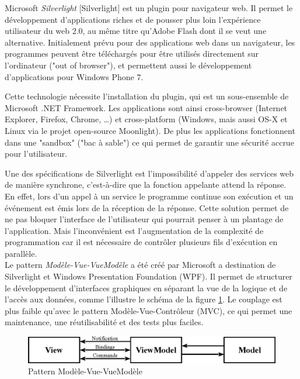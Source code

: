 
Microsoft \textit{Silverlight} [Silverlight] est un plugin pour navigateur web.
Il permet le développement d'applications riches et de pousser plus loin l'expérience utilisateur du web 2.0, au même titre qu'Adobe Flash dont il se veut une alternative.
Initialement prévu pour des applications web dans un navigateur, les programmes peuvent être téléchargés pour être utilisés directement sur l'ordinateur ("out of browser"), et permettent aussi le développement d'applications pour Windows Phone 7.

Cette technologie nécessite l'installation du plugin, qui est un sous-ensemble de Microsoft .NET Framework.
Les applications sont ainsi cross-browser (Internet Explorer, Firefox, Chrome, \ldots) et cross-platform (Windows, mais aussi OS-X et Linux via le projet open-source Moonlight).
De plus les applications fonctionnent dans une "sandbox" ("bac à sable") ce qui permet de garantir une sécurité accrue pour l'utilisateur.

Une des spécifications de Silverlight est l'impossibilité d'appeler des services web de manière synchrone, c'est-à-dire que la fonction appelante attend la réponse.
En effet, lors d'un appel à un service le programme continue son exécution et un événement est émis lors de la réception de la réponse.
Cette solution permet de ne pas bloquer l'interface de l'utilisateur qui pourrait penser à un plantage de l'application.
Mais l'inconvénient est l'augmentation de la complexité de programmation car il est nécessaire de contrôler plusieurs fils d'exécution en parallèle.
\\

Le pattern \textit{Modèle-Vue-VueModèle} a été créé par Microsoft a destination de Silverlight et Windows Presentation Foundation (WPF).
Il permet de structurer le développement d'interfaces graphiques en séparant la vue de la logique et de l'accès aux données, comme l'illustre le schéma de la figure \ref{MVVM}.
Le couplage est plus faible qu'avec le pattern Modèle-Vue-Contrôleur (MVC), ce qui permet une maintenance, une réutilisabilité et des tests plus faciles.
\begin{figure}[!h]
	\center
	\includegraphics[width=1\textwidth]{img/MVVM.png}
	\caption{Pattern Modèle-Vue-VueModèle}
	\label{MVVM}
\end{figure}
~~\\

